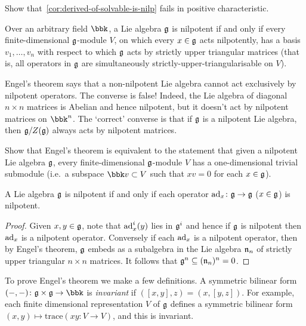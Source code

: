\begin{exercise}
    Show that~\cref{cor:derived-of-solvable-is-nilp} fails in positive characteristic.
\end{exercise}

\begin{theorem} 
     Over an arbitrary field $\bbk$, a Lie
    algebra $\mathfrak{g}$ is nilpotent if and only if every finite-dimensional
    $\mathfrak{g}$-module $V$, on which every $x\in \mathfrak{g}$ acts nilpotently, has a
    basis $v_1,\ldots, v_n$ with respect to which $\mathfrak{g}$ acts by strictly
    upper triangular matrices (that is, all operators in $\mathfrak{g}$ are
    simultaneously strictly-upper-triangularisable on $V$).
\end{theorem}

Engel's theorem says that a non-nilpotent Lie algebra cannot act exclusively by
nilpotent operators. The converse is false! Indeed, the Lie algebra of diagonal
$n\times n$ matrices is Abelian and hence nilpotent, but it doesn't act by
nilpotent matrices on $\bbk^n$. The `correct' converse is that if $\mathfrak{g}$ is a
nilpotent Lie algebra, then $\mathfrak{g}/Z(\mathfrak{g})$ always acts by nilpotent matrices.

\begin{exercise}
    Show that Engel's theorem is equivalent to the statement that given a
    nilpotent Lie algebra $\mathfrak{g}$, every finite-dimensional $\mathfrak{g}$-module $V$
    has a one-dimensional trivial submodule (i.e.\ a subspace $\bbk v\subset V$
    such that $xv=0$ for each $x\in \mathfrak{g}$).
\end{exercise}

\begin{corollary}
    A Lie algebra $\mathfrak{g}$ is nilpotent if and only if each operator
    $\textnormal{ad}_x\colon \mathfrak{g}\to \mathfrak{g}$ ($x\in \mathfrak{g}$) is nilpotent.
    \begin{proof}
        Given $x,y\in \mathfrak{g}$, note that $\textnormal{ad}_x^i(y)$ lies in $\mathfrak{g}^i$ and
        hence if $\mathfrak{g}$ is nilpotent then $\textnormal{ad}_x$ is a nilpotent operator.
        Conversely if each $\textnormal{ad}_x$ is a nilpotent operator, then by Engel's
        theorem, $\mathfrak{g}$ embeds as a subalgebra in the Lie algebra $\mathfrak{n}_n$
        of strictly upper triangular $n\times n$ matrices. It follows that
        $\mathfrak{g}^{n}\subseteq (\mathfrak{n}_n)^{n}=0$.
    \end{proof}
\end{corollary}

To prove Engel's theorem we make a few definitions. A symmetric bilinear form
$(-,-)\colon \frakg\times\frakg\to \bbk$ is \emph{invariant} if
$([x,y],z)=(x,[y,z])$. For example, each finite dimensional representation $V$
of $\mathfrak{g}$ defines a symmetric bilinear form $(x,y)\mapsto \text{trace}(xy\colon V\to V)$, and this is invariant.

